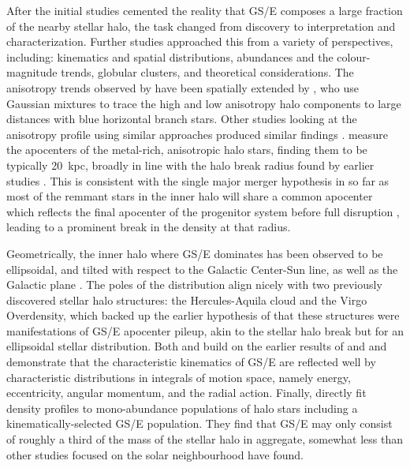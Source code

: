 After the initial studies cemented the reality that GS/E composes a large fraction of the nearby stellar halo, the task changed from discovery to interpretation and characterization. Further studies approached this from a variety of perspectives, including: kinematics and spatial distributions, abundances and the colour-magnitude trends, globular clusters, and theoretical considerations. The anisotropy trends observed by \textcite{belokurov18} have been spatially extended by \textcite{lancaster19}, who use Gaussian mixtures to trace the high and low anisotropy halo components to large distances with blue horizontal branch stars. Other studies looking at the anisotropy profile using similar approaches produced similar findings \parencite{necib19,bird19}. \textcite{deason18} measure the apocenters of the metal-rich, anisotropic halo stars, finding them to be typically 20~kpc, broadly in line with the halo break radius found by earlier studies \parencite[e.g.][]{deason11,sesar11,xue15}. This is consistent with the single major merger hypothesis in so far as most of the remmant stars in the inner halo will share a common apocenter which reflects the final apocenter of the progenitor system before full disruption \parencite[indeed, this was the driver for the hypothesis of][]{deason13}, leading to a prominent break in the density at that radius. 

Geometrically, the inner halo where GS/E dominates has been observed to be ellipsoidal, and tilted with respect to the Galactic Center-Sun line, as well as the Galactic plane \parencite{iorio19}. The poles of the distribution align nicely with two previously discovered stellar halo structures: the Hercules-Aquila cloud and the Virgo Overdensity, which backed up the earlier hypothesis of \textcite{simion19} that these structures were manifestations of GS/E apocenter pileup, akin to the stellar halo break but for an ellipsoidal stellar distribution. Both \textcite{koppelman18} and \textcite{feuillet20} build on the earlier results of \textcite{helmi18} and \textcite{myeong18} and demonstrate that the characteristic kinematics of GS/E are reflected well by characteristic distributions in integrals of motion space, namely energy, eccentricity, angular momentum, and the radial action. Finally, \textcite{mackereth20} directly fit density profiles to mono-abundance populations of halo stars including a kinematically-selected GS/E population. They find that GS/E may only consist of roughly a third of the mass of the stellar halo in aggregate, somewhat less than other studies focused on the solar neighbourhood have found.

